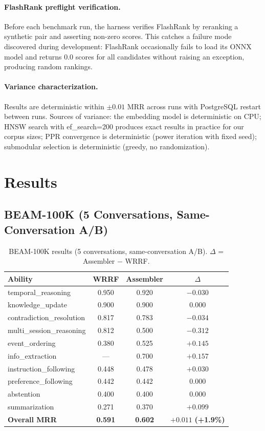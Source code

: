 \documentclass[11pt]{article}
\begin{document}
\paragraph{FlashRank preflight verification.}
Before each benchmark run, the harness verifies FlashRank by reranking
a synthetic pair and asserting non-zero scores.  This catches a
failure mode discovered during development: FlashRank occasionally
fails to load its ONNX model and returns 0.0 scores for all
candidates without raising an exception, producing random rankings.

\paragraph{Variance characterization.}
Results are deterministic within $\pm 0.01$ MRR across runs with
PostgreSQL restart between runs.  Sources of variance: the embedding
model is deterministic on CPU; HNSW search with ef\_search=200
produces exact results in practice for our corpus sizes; PPR
convergence is deterministic (power iteration with fixed seed);
submodular selection is deterministic (greedy, no randomization).

\section{Results}
\label{sec:results}

\subsection{BEAM-100K (5 Conversations, Same-Conversation A/B)}
\label{sec:results-100k}

\begin{table}[t]
\centering
\caption{BEAM-100K results (5 conversations, same-conversation A/B).
  $\Delta$ = Assembler $-$ WRRF.}
\label{tab:100k}
\begin{tabular}{lccc}
\toprule
Ability & WRRF & Assembler & $\Delta$ \\
\midrule
temporal\_reasoning & 0.950 & 0.920 & $-0.030$ \\
knowledge\_update & 0.900 & 0.900 & $0.000$ \\
contradiction\_resolution & 0.817 & 0.783 & $-0.034$ \\
multi\_session\_reasoning & 0.812 & 0.500 & $\mathbf{-0.312}$ \\
event\_ordering & 0.380 & 0.525 & $\mathbf{+0.145}$ \\
info\_extraction & --- & 0.700 & $\mathbf{+0.157}$ \\
instruction\_following & 0.448 & 0.478 & $+0.030$ \\
preference\_following & 0.442 & 0.442 & $0.000$ \\
abstention & 0.400 & 0.400 & $0.000$ \\
summarization & 0.271 & 0.370 & $+0.099$ \\
\midrule
\textbf{Overall MRR} & \textbf{0.591} & \textbf{0.602} & $\mathbf{+0.011}$ \textbf{(+1.9\%)} \\
\bottomrule
\end{tabular}
\end{table}
\end{document}
